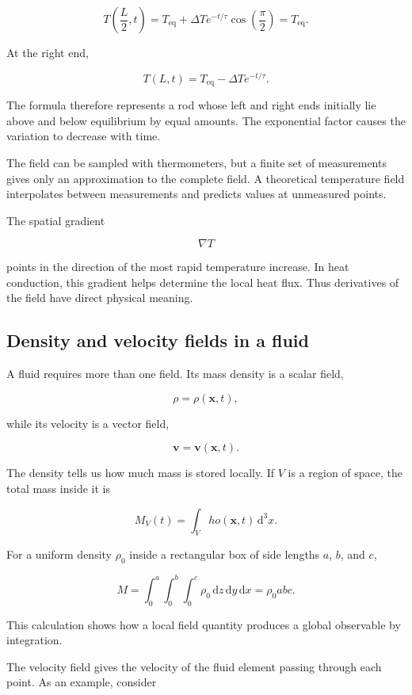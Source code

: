 \[
T\left(\frac{L}{2},t\right)
=
T_{\mathrm{eq}}
+
\Delta T e^{-t/\tau}
\cos\left(\frac{\pi}{2}\right)
=
T_{\mathrm{eq}}.
\]

At the right end,

\[
T(L,t)
=
T_{\mathrm{eq}}
-
\Delta T e^{-t/\tau}.
\]

The formula therefore represents a rod whose left and right ends initially lie above and below equilibrium by equal amounts. The exponential factor causes the variation to decrease with time.

The field can be sampled with thermometers, but a finite set of measurements gives only an approximation to the complete field. A theoretical temperature field interpolates between measurements and predicts values at unmeasured points.

The spatial gradient

\[
\nabla T
\]

points in the direction of the most rapid temperature increase. In heat conduction, this gradient helps determine the local heat flux. Thus derivatives of the field have direct physical meaning.

\subsection{Density and velocity fields in a fluid}

A fluid requires more than one field. Its mass density is a scalar field,

\[
\rho=\rho(\mathbf{x},t),
\]

while its velocity is a vector field,

\[
\mathbf{v}=\mathbf{v}(\mathbf{x},t).
\]

The density tells us how much mass is stored locally. If \(V\) is a region of space, the total mass inside it is

\[
M_{V}(t)
=
\int_{V}
ho(\mathbf{x},t)\,\mathrm{d}^{3}x.
\]

For a uniform density \(\rho_{0}\) inside a rectangular box of side lengths \(a\), \(b\), and \(c\),

\[
M
=
\int_{0}^{a}
\int_{0}^{b}
\int_{0}^{c}
\rho_{0}
\,\mathrm{d}z\,\mathrm{d}y\,\mathrm{d}x
=
\rho_{0}abc.
\]

This calculation shows how a local field quantity produces a global observable by integration.

The velocity field gives the velocity of the fluid element passing through each point. As an example, consider

